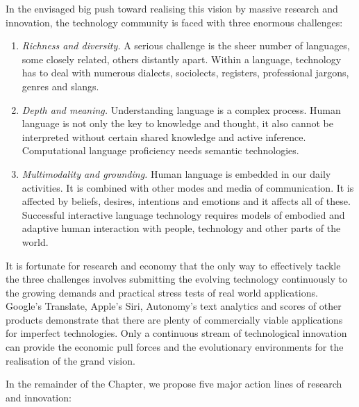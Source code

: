 \documentclass[10pt, plain]{../../metanetpaper}
\begin{document}
\begin{multicols}{2}
In the envisaged big push toward realising this vision by massive research and innovation, the technology community is faced with three enormous challenges:

\begin{enumerate}
\item \emph{Richness and diversity.} A serious challenge is the sheer number of languages, some closely related, others distantly apart. Within a language, technology has to deal with numerous dialects, sociolects, registers, professional jargons, genres and slangs.
\item \emph{Depth and meaning.} Understanding language is a complex process. Human language is not only the key to knowledge and thought, it also cannot be interpreted without certain shared knowledge and active inference. Computational language proficiency needs semantic technologies.
\item \emph{Multimodality and grounding.} Human language is embedded in our daily activities. It is combined with other modes and media of communication. It is affected by beliefs, desires, intentions and emotions and it affects all of these. Successful interactive language technology requires models of embodied and adaptive human interaction with people, technology and other parts of the world.
\end{enumerate}
 
It is fortunate for research and economy that the only way to effectively tackle the three challenges involves submitting the evolving technology continuously to the growing demands and practical stress tests of real world applications. Google's Translate, Apple's Siri, Autonomy's text analytics and scores of other products demonstrate that there are plenty of commercially viable applications for imperfect technologies. Only a continuous stream of technological innovation can provide the economic pull forces and the evolutionary environments for the realisation of the grand vision. 

In the remainder of the Chapter, we propose five major action lines of research and innovation:


\end{multicols}
\end{document}
